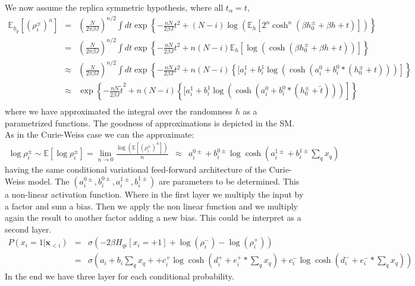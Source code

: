 \documentclass{article}
\begin{document}
We now assume the replica symmetric hypothesis, where all $t_{\alpha} = t$,
\begin{eqnarray}
\mathbb{E}_{\underline{h}_p}\left[(\rho_i^{\pm})^n \right] & = & 
\left(\frac{N}{2\pi \beta J}\right)^{n/2}
\int dt \exp \left\{ -\frac{nN}{2\beta J} t^2 +
(N-i) \log \left(
\mathbb{E}_h\left[
2^n \cosh^n \left( 
\beta h_{0}^{\pm} + \beta h + t
\right)
\right]
\right)
\right\}\\
& = & 
\left(\frac{N}{2\pi \beta J}\right)^{n/2}
\int dt \exp \left\{ -\frac{nN}{2\beta J} t^2 +
n (N-i) \mathbb{E}_h\left[ \log \left(
\cosh \left( 
\beta h_{0}^{\pm} + \beta h + t
\right)
\right)
\right]
\right\}\\
& \approx & 
\left(\frac{N}{2\pi \beta J}\right)^{n/2}
\int dt \exp \left\{ -\frac{nN}{2\beta J} t^2 +
n (N-i)\left\{ [a^1_i + b^1_i \log \left(
\cosh \left( a_i^0 + b_i^0 * (h_{0}^{\pm} + t)
\right)
\right)
\right]
\right\}\\
& \approx & 
\exp \left\{ -\frac{nN}{2\beta J} \tilde{t}^2 +
n (N-i)\left\{ [a^1_i + b^1_i \log \left(
\cosh \left(a_i^0 + b_i^0 * (h_{0}^{\pm} + \tilde{t})
\right)
\right)
\right]
\right\}\\
\end{eqnarray}
where we have approximated the integral over the randomness $h$ as a parametrized functions. The goodness of approximations is depicted in the SM.
As in the Curie-Weiss case we can the approximate:
\begin{eqnarray}
\log\rho_i^{\pm} \sim \mathbb{E}\left[  \log\rho_i^{\pm} \right] = \lim_{n\rightarrow 0} \frac{  \log(\mathbb{E}\left[(\rho_i^{\pm})^n \right])}{n}
& \approx &
a^{0\pm}_i + b^{0\pm}_i \log
\cosh \left(a_i^{1\pm} + b_i^{1\pm} \sum_{q}x_q
\right)
\end{eqnarray}
having the same conditional variational feed-forward architecture of the Curie-Weiss model. 
The $(a^{0\pm}_i,b^{0\pm}_i,a^{1\pm}_i, b^{1\pm}_i)$ are parameters to be determined. This a non-linear activation function. Where in the first layer we multiply the input by a factor and sum a bias. Then we apply the non linear function and we multiply again the result to another factor adding a new bias. This could be interpret as a second layer.
\begin{eqnarray}
P\left(x_{i}=1|\mathbf{x}_{<i}\right) & = & \sigma\left( 
-2 \beta H_{qi}[x_i = +1] +\log(\rho_i^-) - \log(\rho_i^+)
\right) \\
& = & \sigma\left( a_i + b_i\sum_q x_q +
 + c_i^{+}\log\cosh(d_i^{+}+e_i^{+}*\sum_q x_q) + c_i^{-}\log\cosh(d_i^{-}+e_i^{-}*\sum_q x_q)
\right)
\end{eqnarray}
In the end we have three layer for each conditional probability.
\end{document}
